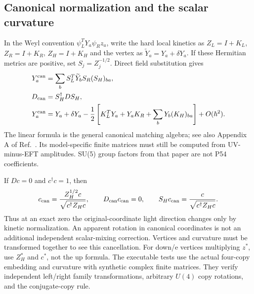 \documentclass[11pt]{article}
\begin{document}
\subsection{Canonical normalization and the scalar curvature}
In the Weyl convention $\psi_L^T Y_a\psi_R z_a$, write the hard local
kinetics as $Z_L=I+K_L$, $Z_R=I+K_R$, $Z_H=I+K_H$ and the vertex as
$\widetilde Y_a=Y_a+\delta Y_a$. If these Hermitian metrics are positive,
set $S_j=Z_j^{-1/2}$. Direct field substitution gives
\begin{align}
 Y^{\rm can}_a&=\sum_b S_L^T\widetilde Y_b S_R(S_H)_{ba},\\
 D_{\rm can}&=S_H^\dagger D S_H,\\
 Y^{\rm can}_a&=Y_a+\delta Y_a-\frac12\left[
 K_L^TY_a+Y_aK_R+\sum_bY_b(K_H)_{ba}\right]+O(\hbar^2).
\label{eq:finiteY}
\end{align}
The linear formula is the general canonical matching algebra; see also
Appendix A of Ref.~\cite{PatelShukla}. Its model-specific finite matrices
must still be computed from UV-minus-EFT amplitudes. SU(5) group factors
from that paper are not P54 coefficients.

If $Dc=0$ and $c^\dagger c=1$, then
\begin{equation}
 c_{\rm can}=\frac{Z_H^{1/2}c}{\sqrt{c^\dagger Z_H c}},\qquad
 D_{\rm can}c_{\rm can}=0,\qquad
 S_Hc_{\rm can}=\frac{c}{\sqrt{c^\dagger Z_Hc}}.
\label{eq:kineticzero}
\end{equation}
Thus at an exact zero the original-coordinate light direction changes only
by kinetic normalization. An apparent rotation in canonical coordinates
is not an additional independent scalar-mixing correction. Vertices and
curvature must be transformed together to see this cancellation.
For down/e vertices multiplying $z^*$, use $Z_H^*$ and $c^*$, not the up
formula. The executable tests use the actual four-copy embedding and
curvature with synthetic complex finite matrices. They verify independent
left/right family transformations, arbitrary $U(4)$ copy rotations, and
the conjugate-copy rule.
\end{document}
